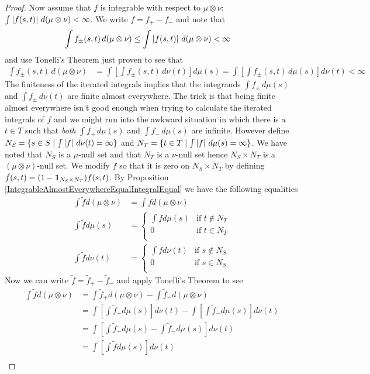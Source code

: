 \begin{proof}
Now assume that $f$ is integrable with respect to $\mu \otimes \nu$: 
$\int \left \vert f(s,t) \right \vert \,  d (\mu \otimes \nu) < \infty$.  We
write $f = f_+ - f_-$ and note that 
\begin{align*}
\int f_\pm(s,t) \,  d (\mu \otimes \nu) &\leq \int \left \vert f(s,t) \right \vert \,  d (\mu \otimes \nu)< \infty
\end{align*} 
and use Tonelli's Theorem just proven to see that 
\begin{align*}
\int f_\pm(s,t) \,  d (\mu \otimes \nu) &= \int \left [ \int f_\pm(s,t) \, d
\nu(t) \right ] d \mu(s)  = \int \left [ \int f_\pm(s,t) \, d \mu(s)
\right ] d\nu(t) < \infty
\end{align*}
The finiteness of the iterated integrals implies that the integrands
$\int f_\pm \, d\mu(s)$ and $\int f_\pm \, d\nu(t)$ are finite almost everywhere.  
The trick is that being finite almost everywhere isn't good
enough when trying to calculate the iterated integrals of $f$ and we
might run into the awkward situation in which there is a $t \in T$
such that \emph{both} $\int f_+ \, d\mu(s)$ and $\int f_- \, d\mu(s)$
are infinite.  However define
$N_S = \{ s \in S \mid \int \left \vert f \right \vert \, d\nu(t) = \infty \}$ and $N_T =
\{ t \in T \mid \int \left \vert f \right \vert \, d\mu(s) = \infty \}$.  We have noted
that $N_S$ is a $\mu$-null set and that $N_T$ is a $\nu$-null set
hence $N_S \times N_T$ is a $(\mu \otimes \nu)$-null set.  We modify
$f$ so that it is zero on $N_S \times N_T$ by defining 
$\tilde{f}(s,t) = (1 - \textbf{1}_{N_S \times N_T}) f(s,t)$.  By Proposition \ref{IntegrableAlmostEverywhereEqualIntegralEqual}
we have the following equalities
\begin{align*}
\int \tilde{f} d(\mu\otimes \nu) &= \int f d(\mu\otimes \nu) \\
\int \tilde{f} d\mu(s) &= \begin{cases}
\int f d\mu(s) & \text{if $t \notin N_T$} \\ 
0 & \text{if $t \in N_T$} \\ 
\end{cases} \\
\int \tilde{f} d\nu(t) &= \begin{cases}
\int f d\nu(t) & \text{if $s \notin N_S$} \\ 
0 & \text{if $s \in N_S$} \\ 
\end{cases}
\end{align*}
Now we can write $\tilde{f} = \tilde{f}_+ - \tilde{f}_-$ and apply
Tonelli's Theorem to see
\begin{align*}
\int \tilde{f} d(\mu\otimes \nu) &= \int \tilde{f}_+ d(\mu\otimes \nu)
- \int \tilde{f}_- d(\mu\otimes \nu) \\
&= \int \left [ \int \tilde{f}_+ d\mu(s)\right ] d \nu(t) - \int \left
  [ \int \tilde{f}_- d\mu(s)\right ] d \nu(t) \\
&= \int \left [  \int \tilde{f}_+ d\mu(s) - \int \tilde{f}_-
d\mu(s) \right ] d \nu(t) \\
&= \int \left [ \int \tilde{f} d\mu(s)\right ] d \nu(t) \\
\end{align*}


\end{proof}
